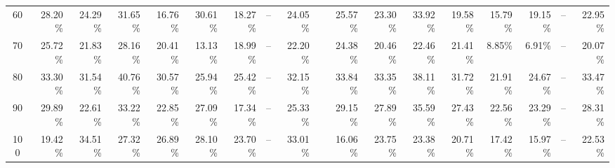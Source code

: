 \begin{table}[h!]
{\begin{tabular}{c rrrrrrrr c rrrrrrrr}
60 & 28.20\% & 24.29\% & 31.65\% & 16.76\% & 30.61\% & 18.27\% & -- & 24.05\% &  & 25.57\% & 23.30\% & 33.92\% & 19.58\% & 15.79\% & 19.15\% & -- & 22.95\% \\
70 & 25.72\% & 21.83\% & 28.16\% & 20.41\% & 13.13\% & 18.99\% & -- & 22.20\% &  & 24.38\% & 20.46\% & 22.46\% & 21.41\% & 8.85\% & 6.91\% & -- & 20.07\% \\
80 & 33.30\% & 31.54\% & 40.76\% & 30.57\% & 25.94\% & 25.42\% & -- & 32.15\% &  & 33.84\% & 33.35\% & 38.11\% & 31.72\% & 21.91\% & 24.67\% & -- & 33.47\% \\
90 & 29.89\% & 22.61\% & 33.22\% & 22.85\% & 27.09\% & 17.34\% & -- & 25.33\% &  & 29.15\% & 27.89\% & 35.59\% & 27.43\% & 22.56\% & 23.29\% & -- & 28.31\% \\
100 & 19.42\% & 34.51\% & 27.32\% & 26.89\% & 28.10\% & 23.70\% & -- & 33.01\% &  & 16.06\% & 23.75\% & 23.38\% & 20.71\% & 17.42\% & 15.97\% & -- & 22.53\% \\
\bottomrule
\end{tabular}%
}
\endgroup
\end{table}

